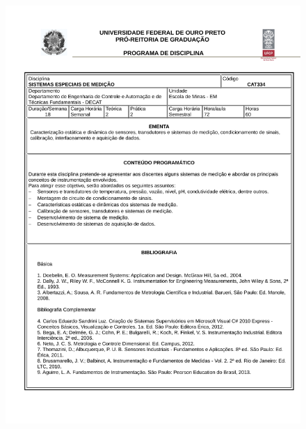\begin{figure}[p]
	\centering 
	\includegraphics[scale=0.7]{capitulos/anexo1-programas-disciplina/eg15.pdf}
\end{figure}

